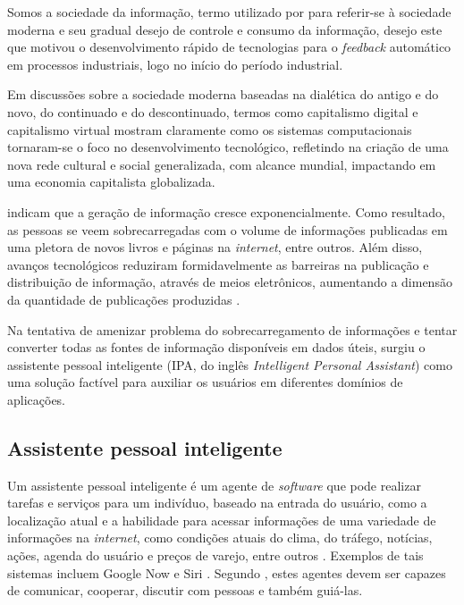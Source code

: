 

Somos a sociedade da informação, termo utilizado por
 para referir-se à 
sociedade moderna e seu gradual desejo de controle e consumo da 
informação, desejo este que motivou o
desenvolvimento rápido de tecnologias para o \textit{feedback} automático
em processos industriais, logo no início do período industrial.

Em discussões sobre a sociedade moderna baseadas na dialética do antigo e do novo,
do continuado e do descontinuado, termos como 
capitalismo digital \cite{citeulike:8018090} e
capitalismo virtual \cite{VirtualCapitalism} mostram claramente como
os sistemas computacionais tornaram-se o foco no desenvolvimento tecnológico,
refletindo na criação de uma nova rede cultural e social generalizada, com 
alcance mundial, impactando em uma economia capitalista globalizada.

 indicam que a geração
de informação cresce exponencialmente.  Como resultado, as pessoas
se veem sobrecarregadas com o volume de informações publicadas em uma
pletora de novos livros e páginas na \textit{internet}, entre outros.  Além disso,
avanços tecnológicos reduziram formidavelmente as barreiras na publicação
e distribuição de informação, através de meios eletrônicos, aumentando a 
dimensão da quantidade de publicações produzidas \cite{rao2008application}.

Na tentativa de amenizar problema do sobrecarregamento de informações e
tentar converter todas as fontes de informação disponíveis em dados úteis,
surgiu o assistente pessoal inteligente (IPA, do inglês \textit{Intelligent
Personal Assistant}) como uma solução factível para auxiliar os usuários
em diferentes domínios de aplicações.

\subsection{Assistente pessoal inteligente}


Um assistente pessoal inteligente é um agente de \textit{software}
que pode realizar tarefas e serviços para um indivíduo, baseado na
entrada do usuário, como a localização atual e a habilidade para
acessar informações de uma variedade de informações na \textit{internet}, como
condições atuais do clima, do tráfego, notícias, ações, agenda do
usuário e preços de varejo, entre outros \cite{kaschek2007intelligent}.
Exemplos de tais sistemas incluem Google Now \cite{GoogleNow} e 
Siri \cite{Siri}.   Segundo , estes agentes devem 
ser capazes de comunicar, cooperar, discutir com pessoas e também 
guiá-las.


